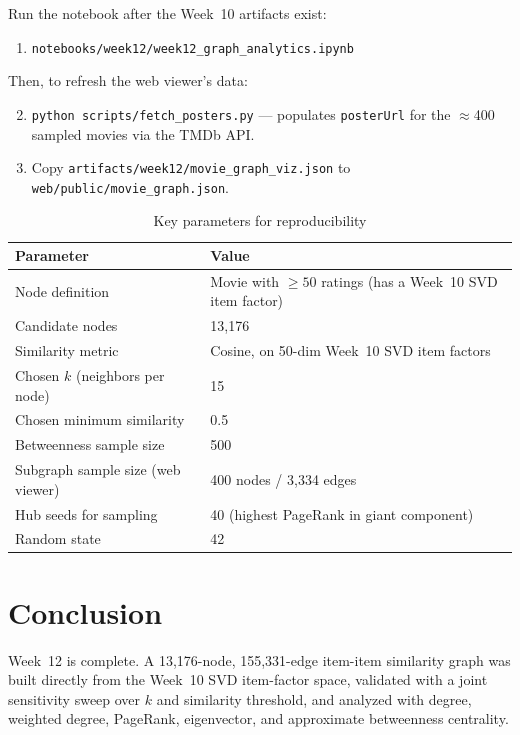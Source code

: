 \documentclass[12pt,a4paper]{article}
\begin{document}
Run the notebook after the Week~10 artifacts exist:
\begin{enumerate}[nosep]
  \item \texttt{notebooks/week12/week12\_graph\_analytics.ipynb}
\end{enumerate}

Then, to refresh the web viewer's data:
\begin{enumerate}[nosep]
  \setcounter{enumi}{1}
  \item \texttt{python scripts/fetch\_posters.py} --- populates \texttt{posterUrl} for the
    $\approx$400 sampled movies via the TMDb API.
  \item Copy \texttt{artifacts/week12/movie\_graph\_viz.json} to
    \texttt{web/public/movie\_graph.json}.
\end{enumerate}

\begin{table}[H]
\centering
\caption{Key parameters for reproducibility}
\begin{tabular}{ll}
\toprule
\textbf{Parameter} & \textbf{Value} \\
\midrule
Node definition & Movie with $\geq50$ ratings (has a Week~10 SVD item factor) \\
Candidate nodes & 13,176 \\
Similarity metric & Cosine, on 50-dim Week~10 SVD item factors \\
Chosen $k$ (neighbors per node) & 15 \\
Chosen minimum similarity & 0.5 \\
Betweenness sample size & 500 \\
Subgraph sample size (web viewer) & 400 nodes / 3,334 edges \\
Hub seeds for sampling & 40 (highest PageRank in giant component) \\
Random state & 42 \\
\bottomrule
\end{tabular}
\end{table}

\section{Conclusion}

Week~12 is complete. A 13,176-node, 155,331-edge item-item similarity graph was built directly from
the Week~10 SVD item-factor space, validated with a joint sensitivity sweep over $k$ and similarity
threshold, and analyzed with degree, weighted degree, PageRank, eigenvector, and approximate
betweenness centrality.
\end{document}
